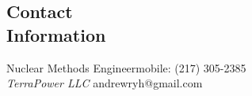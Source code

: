 \documentclass[margin,line]{resume}
\begin{document}
\begin{resume}

    \section{\mysidestyle Contact\\Information}

    Nuclear Methods Engineer\hfill mobile: (217) 305-2385 \vspace{0mm}\\\vspace{0mm}
    \hspace{-1.35mm}\textsl{TerraPower LLC}       \hfill andrewryh@gmail.com    
        \vspace{0mm}\\\vspace{-6mm}%
       

\end{resume}
\end{document}
